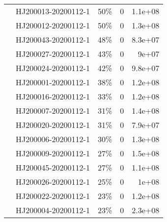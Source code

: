 \begin{tabular}{llrrr}
                  & HJ200013-20200112-1 &                                       50\% &                        0 &                   1.1e+08 \\
                  & HJ200012-20200112-1 &                                       50\% &                        0 &                   1.3e+08 \\
                  & HJ200043-20200112-1 &                                       48\% &                        0 &                   8.3e+07 \\
                  & HJ200027-20200112-1 &                                       43\% &                        0 &                     9e+07 \\
                  & HJ200024-20200112-1 &                                       42\% &                        0 &                   9.8e+07 \\
                  & HJ200001-20200112-1 &                                       38\% &                        0 &                   1.2e+08 \\
                  & HJ200016-20200112-1 &                                       33\% &                        0 &                   1.2e+08 \\
                  & HJ200007-20200112-1 &                                       31\% &                        0 &                   1.4e+08 \\
                  & HJ200020-20200112-1 &                                       31\% &                        0 &                   7.9e+07 \\
                  & HJ200006-20200112-1 &                                       30\% &                        0 &                   1.3e+08 \\
                  & HJ200009-20200112-1 &                                       27\% &                        0 &                   1.5e+08 \\
                  & HJ200045-20200112-1 &                                       27\% &                        0 &                   1.1e+08 \\
                  & HJ200026-20200112-1 &                                       25\% &                        0 &                     1e+08 \\
                  & HJ200022-20200112-1 &                                       23\% &                        0 &                   1.2e+08 \\
                  & HJ200004-20200112-1 &                                       23\% &                        0 &                   2.3e+08 \\

\end{tabular}
